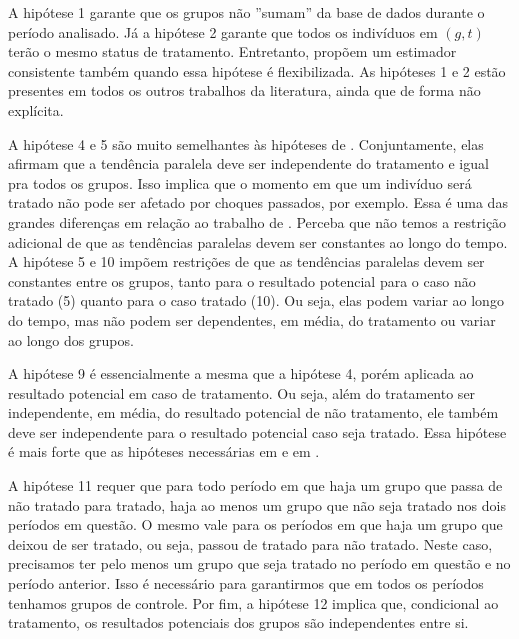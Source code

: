 \documentclass[portugues]{article}
\begin{document}
A hipótese 1 garante que os grupos não ''sumam'' da base de dados durante o período analisado. Já a hipótese 2 garante que todos os indivíduos em $(g,t)$ terão o mesmo status de tratamento. Entretanto, \citet{de2020two} propõem um estimador consistente também quando essa hipótese é flexibilizada. %
As hipóteses 1 e 2 estão presentes em todos os outros trabalhos da literatura, ainda que de forma não explícita.

A hipótese 4 e 5 são muito semelhantes às hipóteses de \citet{sun2021estimating}. Conjuntamente, elas afirmam que a tendência paralela deve ser independente do tratamento e igual pra todos os grupos. Isso implica que o momento em que um indivíduo será tratado não pode ser afetado por choques passados, por exemplo. Essa é uma das grandes diferenças em relação ao trabalho de \citet{callaway2021difference}. Perceba que não temos a restrição adicional de que as tendências paralelas devem ser constantes ao longo do tempo. A hipótese 5 e 10 impõem restrições de que as tendências paralelas devem ser constantes entre os grupos, tanto para o resultado potencial para o caso não tratado (5) quanto para o caso tratado (10). Ou seja, elas podem variar ao longo do tempo, mas não podem ser dependentes, em média, do tratamento ou variar ao longo dos grupos.

A hipótese 9 é essencialmente a mesma que a hipótese 4, porém aplicada ao resultado potencial em caso de tratamento. Ou seja, além do tratamento ser independente, em média, do resultado potencial de não tratamento, ele também deve ser independente para o resultado potencial caso seja tratado. Essa hipótese é mais forte que as hipóteses necessárias em \cite{callaway2021difference} e em \cite{sun2021estimating}. 

A hipótese 11 requer que para todo período em que haja um grupo que passa de não tratado para tratado, haja ao menos um grupo que não seja tratado nos dois períodos em questão. O mesmo vale para os períodos em que haja um grupo que deixou de ser tratado, ou seja, passou de tratado para não tratado. Neste caso, precisamos ter pelo menos um grupo que seja tratado no período em questão e no período anterior. Isso é necessário para garantirmos que em todos os períodos tenhamos grupos de controle. Por fim, a hipótese 12 implica que, condicional ao tratamento, os resultados potenciais dos grupos são independentes entre si.
\end{document}
